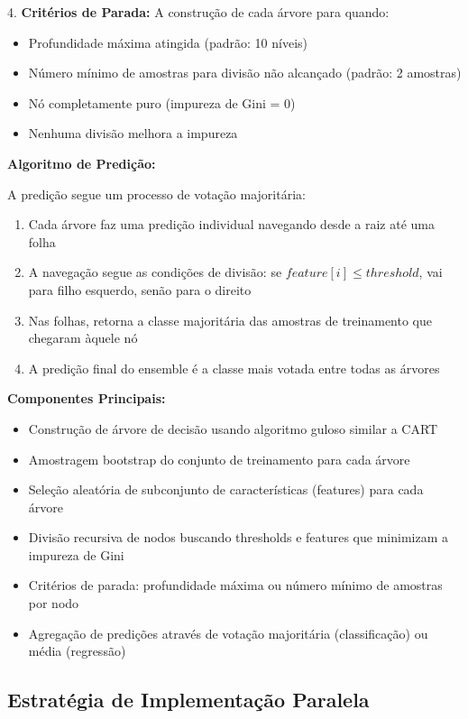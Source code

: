\documentclass[a4paper,11pt]{article}
\begin{document}
4. \textbf{Critérios de Parada:} A construção de cada árvore para quando:
   \begin{itemize}
       \item Profundidade máxima atingida (padrão: 10 níveis)
       \item Número mínimo de amostras para divisão não alcançado (padrão: 2 amostras)
       \item Nó completamente puro (impureza de Gini = 0)
       \item Nenhuma divisão melhora a impureza
   \end{itemize}

\textbf{Algoritmo de Predição:}

A predição segue um processo de votação majoritária:
\begin{enumerate}
    \item Cada árvore faz uma predição individual navegando desde a raiz até uma folha
    \item A navegação segue as condições de divisão: se $feature[i] \leq threshold$, vai para filho esquerdo, senão para o direito
    \item Nas folhas, retorna a classe majoritária das amostras de treinamento que chegaram àquele nó
    \item A predição final do ensemble é a classe mais votada entre todas as árvores
\end{enumerate}

\textbf{Componentes Principais:}
\begin{itemize}
    \item Construção de árvore de decisão usando algoritmo guloso similar a CART
    \item Amostragem bootstrap do conjunto de treinamento para cada árvore
    \item Seleção aleatória de subconjunto de características (features) para cada árvore
    \item Divisão recursiva de nodos buscando thresholds e features que minimizam a impureza de Gini
    \item Critérios de parada: profundidade máxima ou número mínimo de amostras por nodo
    \item Agregação de predições através de votação majoritária (classificação) ou média (regressão)
\end{itemize}

\subsection{Estratégia de Implementação Paralela}
\end{document}

